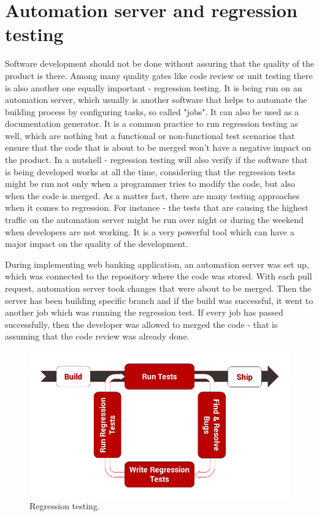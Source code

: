 \documentclass[a4paper,12pt]{book}
\newcommand\tab[1][1cm]{\hspace*{#1}}
\begin{document}
\section{Automation server and regression testing}
{
\tab Software development should not be done without assuring that the quality of the product is there. Among many quality gates like code review or unit testing there is also another one equally important - regression testing. It is being run on an automation server, which usually is another software that helps to automate the building process by configuring tasks, so called "jobs". It can also be used as a documentation generator. It is a common practice to run regression testing as well, which are nothing but a functional or non-functional test scenarios that ensure that the code that is about to be merged won't have a negative impact on the product. In a nutshell - regression testing will also verify if the software that is being developed works at all the time, considering that the regression tests might be run not only when a programmer tries to modify the code, but also when the code is merged. As a matter fact, there are many testing approaches when it comes to regression. For instance - the tests that are causing the highest traffic on the automation server might be run over night or during the weekend when developers are not working. It is a very powerful tool which can have a major impact on the quality of the development.

\bigskip During implementing web banking application, an automation server was set up, which was connected to the repository where the code was stored. With each pull request, automation server took changes that were about to be merged. Then the server has been building specific branch and if the build was successful, it went to another job which was running the regression test. If every job has passed successfully, then the developer was allowed to merged the code - that is assuming that the code review was already done.

\begin{figure}[h]
  \centering
    \includegraphics[width=1.0\textwidth]{regression}
    \caption{Regression testing.~\cite{reg}}
\end{figure}

}
\end{document}
